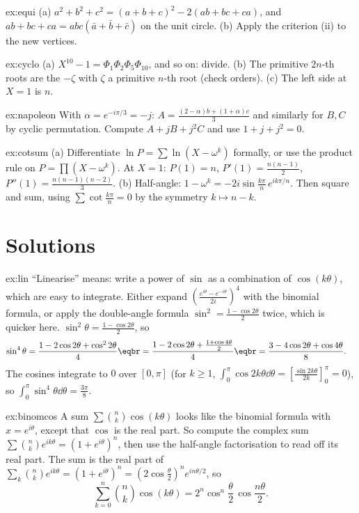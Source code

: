 \begin{hint}{ex:equi}
(a) $a^2+b^2+c^2=(a+b+c)^2-2(ab+bc+ca)$, and $ab+bc+ca=abc(\bar a+\bar b+\bar c)$ on the unit circle. (b) Apply the criterion (ii) to the new vertices.
\end{hint}
\begin{hint}{ex:cyclo}
(a) $X^{10}-1=\Phi_1\Phi_2\Phi_5\Phi_{10}$, and so on: divide. (b) The primitive $2n$-th roots are the $-\zeta$ with $\zeta$ a primitive $n$-th root (check orders). (c) The left side at $X=1$ is $n$.
\end{hint}
\begin{hint}{ex:napoleon}
With $\alpha=e^{-i\pi/3}=-j$: $A=\frac{(2-\alpha)b+(1+\alpha)c}3$ and similarly for $B,C$ by cyclic permutation. Compute $A+jB+j^2C$ and use $1+j+j^2=0$.
\end{hint}
\begin{hint}{ex:cotsum}
(a) Differentiate $\ln P=\sum\ln(X-\omega^k)$ formally, or use the product rule on $P=\prod(X-\omega^k)$. At $X=1$: $P(1)=n$, $P'(1)=\frac{n(n-1)}2$, $P''(1)=\frac{n(n-1)(n-2)}3$. (b) Half-angle: $1-\omega^k=-2i\sin\frac{k\pi}n\,e^{ik\pi/n}$. Then square and sum, using $\sum\cot\frac{k\pi}n=0$ by the symmetry $k\mapsto n-k$.
\end{hint}

\section{Solutions}

\begin{solution}{ex:lin}
\idea ``Linearise'' means: write a power of $\sin$ as a combination of $\cos(k\theta)$, which are easy to integrate. Either expand $\left(\frac{e^{i\theta}-e^{-i\theta}}{2i}\right)^4$ with the binomial formula, or apply the double-angle formula $\sin^2=\frac{1-\cos2\theta}2$ twice, which is quicker here.
\writeup $\sin^2\theta=\frac{1-\cos2\theta}2$, so
\[
\begin{aligned}\sin^4\theta&=\frac{1-2\cos2\theta+\cos^22\theta}4\eqbr=\frac{1-2\cos2\theta+\frac{1+\cos4\theta}2}4\eqbr=\frac{3-4\cos2\theta+\cos4\theta}8.\end{aligned}
\]
The cosines integrate to $0$ over $[0,\pi]$ (for $k\ge1$, $\int_0^\pi\cos 2k\theta\dd\theta=\left[\frac{\sin2k\theta}{2k}\right]_0^\pi=0$), so $\int_0^\pi\sin^4\theta\dd\theta=\frac{3\pi}8$.
\end{solution}

\begin{solution}{ex:binomcos}
\idea A sum $\sum\binom nk\cos(k\theta)$ looks like the binomial formula with $x=e^{i\theta}$, except that $\cos$ is the real part. So compute the complex sum $\sum\binom nke^{ik\theta}=(1+e^{i\theta})^n$, then use the half-angle factorisation to read off its real part.
\writeup The sum is the real part of $\sum_k\binom nke^{ik\theta}=\left(1+e^{i\theta}\right)^n=\left(2\cos\frac\theta2\right)^ne^{in\theta/2}$, so
\[
\sum_{k=0}^n\binom nk\cos(k\theta)=2^n\cos^n\frac\theta2\,\cos\frac{n\theta}2.
\]
\end{solution}

